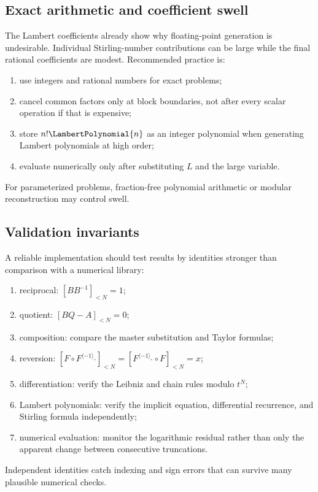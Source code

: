 \documentclass[11pt]{article}
\theoremstyle{pltheorem}
\newcommand{\rev}{\langle-1\rangle_{\circ}}
\newcommand{\compose}{\mathbin{\circ}}
\begin{document}
\subsection{Exact arithmetic and coefficient swell}

The Lambert coefficients already show why floating-point generation is undesirable.  Individual Stirling-number contributions can be large while the final rational coefficients are modest.  Recommended practice is:
\begin{enumerate}
\item use integers and rational numbers for exact problems;
\item cancel common factors only at block boundaries, not after every scalar operation if that is expensive;
\item store \(n!\LambertPolynomial{n}\) as an integer polynomial when generating Lambert polynomials at high order;
\item evaluate numerically only after substituting \(L\) and the large variable.
\end{enumerate}
For parameterized problems, fraction-free polynomial arithmetic or modular reconstruction may control swell.

\subsection{Validation invariants}

A reliable implementation should test results by identities stronger than comparison with a numerical library:
\begin{enumerate}
\item reciprocal: \([BB^{-1}]_{<N}=1\);
\item quotient: \([BQ-A]_{<N}=0\);
\item composition: compare the master substitution and Taylor formulas;
\item reversion: \([F\compose F^{\rev}]_{<N}=[F^{\rev}\compose F]_{<N}=x\);
\item differentiation: verify the Leibniz and chain rules modulo \(t^N\);
\item Lambert polynomials: verify the implicit equation, differential recurrence, and Stirling formula independently;
\item numerical evaluation: monitor the logarithmic residual rather than only the apparent change between consecutive truncations.
\end{enumerate}
Independent identities catch indexing and sign errors that can survive many plausible numerical checks.
\end{document}

